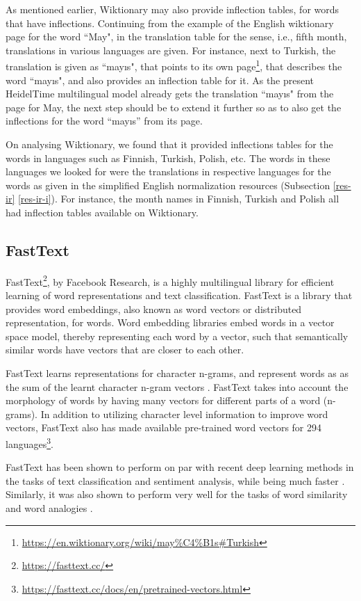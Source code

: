 As mentioned earlier, Wiktionary may also provide inflection tables, for words that have inflections. Continuing from the example of the English wiktionary page for the word ``May", in the translation table for the sense, i.e., fifth month, translations in various languages are given. For instance, next to Turkish, the translation is given as ``mayıs", that points to its own page\footnote{\url{https://en.wiktionary.org/wiki/may\%C4\%B1s\#Turkish}}, that describes the word ``mayıs", and also provides an inflection table for it. As the present HeidelTime multilingual model already gets the translation ``mayıs" from the page for May, the next step should be to extend it further so as to also get the inflections for the word ``mayıs'' from its page. 

On analysing Wiktionary, we found that it provided inflections tables for the words in languages such as Finnish, Turkish, Polish, etc.  The words in these languages we looked for were the translations in respective languages for the words as given in the simplified English normalization resources (Subsection \ref{res-ir} \ref{res-ir-i}). For instance, the month names in Finnish, Turkish and Polish all had inflection tables available on Wiktionary. 
	
\subsection{FastText}
FastText\footnote{\url{https://fasttext.cc/}}, by Facebook Research, is a highly multilingual library for efficient learning of word representations and text classification. FastText is a library that provides word embeddings, also known as word vectors or distributed representation, for words. Word embedding libraries embed words in a vector space model, thereby representing each word by a vector, such that semantically similar words have vectors that are closer to each other. 

FastText learns representations for character n-grams, and represent words as as the sum of the learnt character n-gram vectors \cite{DBLP:journals/tacl/BojanowskiGJM17}. FastText takes into account the morphology of words by having many vectors for different parts of a word (n-grams). In addition to utilizing character level information to improve word vectors, FastText also has made available pre-trained word vectors for 294 languages\footnote{\url{https://fasttext.cc/docs/en/pretrained-vectors.html}}. 

FastText has been shown to perform on par with recent deep learning methods in the tasks of text classification and sentiment analysis, while being much faster \cite{DBLP:journals/corr/JoulinGBM16}. Similarly, it was also shown to perform very well for the tasks of word similarity and word analogies \cite{DBLP:journals/tacl/BojanowskiGJM17}. 


